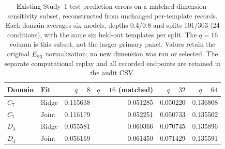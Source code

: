 \begin{table}[htbp]
\caption{Existing Study~1 test prediction errors on a matched dimension-sensitivity subset, reconstructed from unchanged per-template records. Each domain averages six models, depths 0.4/0.8 and splits 101/303 (24 conditions), with the same six held-out templates per split. The $q=16$ column is this subset, not the larger primary panel. Values retain the original $E_{\mathrm{eq}}$ normalization; no new dimension was run or selected. The separate computational replay and all recorded endpoints are retained in the audit CSV.}
\label{tab:dimension-sensitivity-audit}
\centering\small
\begin{tabular}{@{}llrrrr@{}}
\toprule
Domain & Fit & $q=8$ & $q=16$ (matched) & $q=32$ & $q=64$ \\
\midrule
$C_7$ & Ridge & 0.115638 & 0.051285 & 0.050220 & 0.136808 \\
$C_7$ & Joint & 0.116179 & 0.052251 & 0.050733 & 0.135502 \\
$D_4$ & Ridge & 0.055581 & 0.060366 & 0.070745 & 0.135896 \\
$D_4$ & Joint & 0.056169 & 0.061450 & 0.071429 & 0.135591 \\
\bottomrule
\end{tabular}
\end{table}
